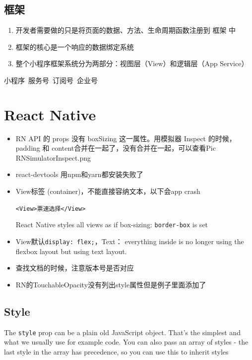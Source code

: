 \documentclass[a4paper, 12pt]{article}
\begin{document}
\subsection{框架}
\begin{enumerate}

\item 开发者需要做的只是将页面的数据、方法、生命周期函数注册到 框架 中

\item 框架的核心是一个响应的数据绑定系统
\item 整个小程序框架系统分为两部分：视图层（View）和逻辑层（App Service）
\end{enumerate}

\vspace{2in}
小程序~服务号~订阅号~企业号


\section{React Native}
\begin{itemize}
\item RN API 的 props 没有 boxSizing 这一属性。用模拟器 Inspect 的时候，padding 和 content合并在一起了，没有合并在一起，可以查看Pic RNSimulatorInspect.png

\item react-devtools 用npm和yarn都安装失败了

\item View标签 (container)，不能直接容纳文本，以下会app crash

\verb|<View>票速选择</View>|

React Native styles all views as if box-sizing: \verb|border-box| is set

\item View默认\verb|display: flex;|，Text： everything inside is no longer using the flexbox layout but using text layout.

\item 查找文档的时候，注意版本号是否对应

\item RN的TouchableOpacity没有列出style属性但是例子里面添加了
\end{itemize}

\subsection{Style}
The \verb|style| prop can be a plain old JavaScript object. That's the simplest and what we usually use for example code. You can also pass an array of styles - the last style in the array has precedence, so you can use this to inherit styles
\end{document}
